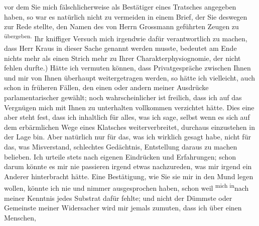 {\begin{ledgroupsized}[t]{13cm}
               vor dem Sie mich fälschlicherweise als Bestätiger eines Tratsches angegeben haben, so
               war es natürlich nicht zu vermeiden in einem Brief, der Sie deswegen zur Rede
               stellte, den Namen des von Herrn Grossmann
               geführten Zeugen zu \substVorne{}\textsuperscript{übergeben.}{\allowbreak}\substDazwischen{}\label{T_L02019_1v}\label{T_L02019_1h}\substHinten{}\pend
           \pstart
           Ihr kniffiger Versuch mich irgendwie dafür verantwortlich zu machen, dass Herr Kraus in dieser Sache genannt werden musste,
               bedeutet am Ende nichts mehr als einen Strich mehr zu Ihrer Charakterphysiognomie,
               der nicht fehlen durfte.) Hätte ich vermuten können, dass Privatgespräche zwischen
               Ihnen und mir von Ihnen überhaupt weitergetragen werden, so hätte ich vielleicht,
               auch schon in früheren Fällen, den einen oder
               andern meiner Ausdrücke parlamentarischer gewählt; noch wahrscheinlicher ist
               freilich, dass ich auf das Vergnügen mich mit Ihnen zu unterhalten vollkommen
               verzichtet hätte. Dies eine aber steht fest, dass ich inhaltlich für alles, was ich
               sage, selbst wenn es {\pb}sich auf dem erbärmlichen Wege eines
               Klatsches weiterverbreitet, durchaus einzustehen in der Lage bin. Aber natürlich nur
               für das, was ich wirklich gesagt habe, nicht für das, was Misverstand, schlechtes
               Gedächtnis, Entstellung daraus zu machen belieben. Ich urteile stets nach eigenen
               Eindrücken und Erfahrungen; schon darum könnte es mir nie passieren irgend etwas
               nachzureden, was mir irgend ein Anderer hinterbracht hätte. Eine Bestätigung, wie Sie
               sie mir in den Mund legen wollen, könnte ich nie und nimmer ausgesprochen haben,
               schon weil \substVorne{}\textsuperscript{mich in}{\allowbreak}\substDazwischen{}nach\substHinten{} meiner Kenntnis jedes Substrat dafür fehlte; und nicht der Dümmste oder
               Gemeinste meiner Widersacher wird mir jemals zumuten, dass ich über einen Menschen,

\end{ledgroupsized}}
